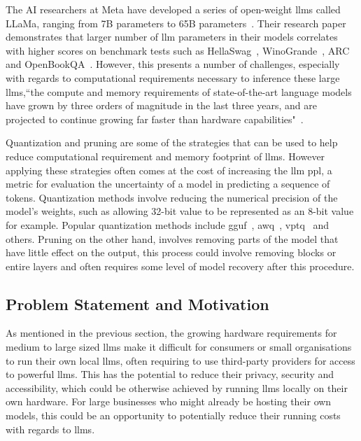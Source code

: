 \documentclass{ifacconf}
\begin{document}
	The AI researchers at Meta have developed a series of open-weight \glspl{llm} called LLaMa, ranging from 7B parameters to 65B parameters~\cite{touvron2023llamaopenefficientfoundation}. Their research paper demonstrates that larger number of \gls{llm} parameters in their models correlates with higher scores on benchmark tests such as HellaSwag~\cite{zellers2019hellaswagmachinereallyfinish}, WinoGrande~\cite{sakaguchi2019winograndeadversarialwinogradschema}, ARC~\cite{clark2018thinksolvedquestionanswering} and OpenBookQA~\cite{mihaylov2018suitarmorconductelectricity}. However, this presents a number of challenges, especially with regards to computational requirements necessary to inference these large \glspl{llm},``the compute and memory requirements of state-of-the-art language models have grown by three orders of magnitude in the last three years, and are projected to continue growing far faster than hardware capabilities"~\cite[p.~97]{bommasani2022opportunitiesrisksfoundationmodels}.
	
	Quantization and pruning are some of the strategies that can be used to help reduce computational requirement and memory footprint of \glspl{llm}. However applying these strategies often comes at the cost of increasing the \gls{llm} \gls{ppl}, a metric for evaluation the uncertainty of a model in predicting a sequence of tokens. Quantization methods involve reducing the numerical precision of the model's weights, such as allowing 32-bit value to be represented as an 8-bit value for example. Popular quantization methods include \gls{gguf}~\cite{llamacpp, ggml}, \gls{awq}~\cite{lin2024awqactivationawareweightquantization}, \gls{vptq}~\cite{liu2024vptqextremelowbitvector} and others. Pruning on the other hand, involves removing parts of the model that have little effect on the output, this process could involve removing blocks or entire layers and often requires some level of model recovery after this procedure.
	
	\subsection{Problem Statement and Motivation}
	
	As mentioned in the previous section, the growing hardware requirements for medium to large sized  \glspl{llm} make it difficult for consumers or small organisations to run their own local  \glspl{llm}, often requiring to use third-party providers for access to powerful  \glspl{llm}. This has the potential to reduce their privacy, security and accessibility, which could be otherwise achieved by running \glspl{llm} locally on their own hardware. For large businesses who might already be hosting their own models, this could be an opportunity to potentially reduce their running costs with regards to \glspl{llm}.
	
\end{document}
